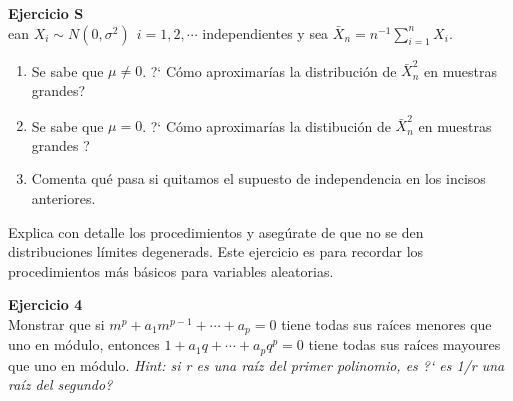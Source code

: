 \documentclass[a4paper, 11pt]{article}
\newenvironment{problem}[2][Ejercicio]
{ \begin{mdframed}[backgroundcolor= red!50] \textbf{#1 #2} \\}
	{  \end{mdframed}}
\begin{document}
\begin{problem}
    Sean $X_i \sim N(0, \sigma^2) \: \: i = 1,2,\cdots$ independientes y sea $\bar{X}_n = n^{-1} \sum _{i=1}^n X_i .$
    \begin{enumerate}
        \item Se sabe que $\mu \neq 0$. ?` Cómo aproximarías la distribución de $\bar{X}_n^2 $ en muestras grandes? 
        \item Se sabe que $\mu = 0$. ?` Cómo aproximarías la distibución de $\bar{X}_n^2$ en muestras grandes ?
        \item Comenta qué pasa si quitamos el supuesto de independencia en los incisos anteriores. 
    \end{enumerate} 
    Explica con detalle los procedimientos y asegúrate de que no se den distribuciones límites degenerads. Este ejercicio es para recordar los procedimientos más básicos para variables aleatorias.
\end{problem}

\begin{problem}{4}
    Monstrar que si $m^p + a_1 m^{p-1} + \cdots + a_p = 0 $ tiene todas sus raíces menores que uno en módulo, entonces $1+ a_1 q + \cdots + a_p q^p = 0$ tiene todas sus raíces mayoures que uno en módulo. \textit{Hint: si r es una raíz del primer polinomio, es ?` es 1/r una raíz del segundo?}    
\end{problem}

\end{document}
